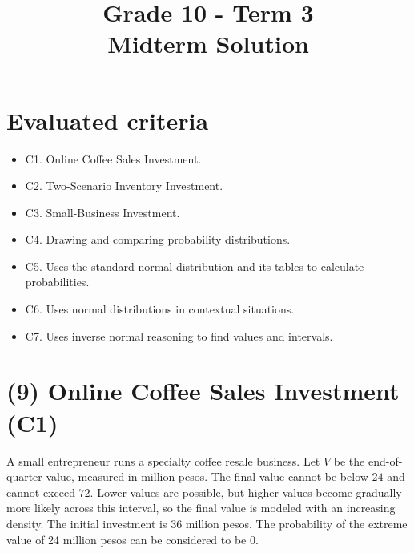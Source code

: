 \makeatletter
{}
\makeatother






\title{Grade 10 - Term 3 \\ Midterm Solution}
\author{}
\date{}


	\maketitle
	
	\setcounter{tocdepth}{1}
	\setcounter{secnumdepth}{2}
	\label{toc}
	\tableofcontents
	
	\section*{Evaluated criteria}
	\begin{itemize}
		\item C1. Online Coffee Sales Investment.
		\item C2. Two-Scenario Inventory Investment.
		\item C3. Small-Business Investment.
		\item C4. Drawing and comparing probability distributions.
		\item C5. Uses the standard normal distribution and its tables to calculate probabilities.
		\item C6. Uses normal distributions in contextual situations.
		\item C7. Uses inverse normal reasoning to find values and intervals.
	\end{itemize}
	
\section{(9) Online Coffee Sales Investment (C1)}
\label{sec:online-coffee-sales-investment-c1}

A small entrepreneur runs a specialty coffee resale business. Let $V$ be the end-of-quarter value, measured in million pesos. The final value cannot be below $24$ and cannot exceed $72$. Lower values are possible, but higher values become gradually more likely across this interval, so the final value is modeled with an increasing density. The initial investment is $36$ million pesos. The probability of the extreme value of 24 million pesos can be considered to be 0.

